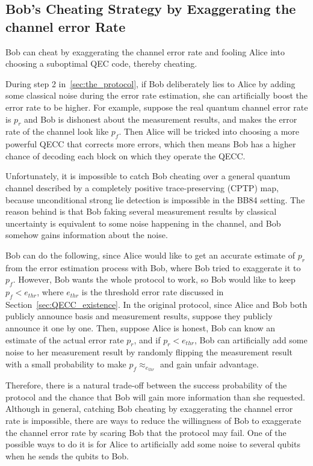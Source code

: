 \documentclass[%
 reprint,
superscriptaddress,
 amsmath,amssymb,
 aps,
]{revtex4-2}
\begin{document}
\subsection{Bob's Cheating Strategy by Exaggerating the channel error Rate}
\label{sec:Bob_cheating_error_rate}

Bob can cheat by exaggerating the channel error rate and fooling Alice into choosing a suboptimal QEC code, thereby cheating.

During step 2 in~\ref{sec:the_protocol}, if Bob deliberately lies to Alice by adding some classical noise during the error rate estimation, she can artificially boost the error rate to be higher. For example, suppose the real quantum channel error rate is $p_r$ and Bob is dishonest about the measurement results, and makes the error rate of the channel look like $p_f$. Then Alice will be tricked into choosing a more powerful QECC that corrects more errors, which then means Bob has a higher chance of decoding each block on which they operate the QECC.

Unfortunately, it is impossible to catch Bob cheating over a general quantum channel described by a completely positive trace-preserving (CPTP) map, because unconditional strong lie detection is impossible in the BB84 setting. The reason behind is that Bob faking several measurement results by classical uncertainty is equivalent to some noise happening in the channel, and Bob somehow gains information about the noise.

Bob can do the following, since Alice would like to get an accurate estimate of $p_r$ from the error estimation process with Bob, where Bob tried to exaggerate it to $p_f$. However, Bob wants the whole protocol to work, so Bob would like to keep $p_f<e_{thr}$, where $e_{thr}$ is the threshold error rate discussed in Section~\ref{sec:QECC_existence}. In the original protocol, since Alice and Bob both publicly announce basis and measurement results, suppose they publicly announce it one by one. Then, suppose Alice is honest, Bob can know an estimate of the actual error rate $p_r$, and if $p_r<e_{thr}$, Bob can artificially add some noise to her measurement result by randomly flipping the measurement result with a small probability to make $p_f\approx_{e_{thr}}$ and gain unfair advantage.

Therefore, there is a natural trade-off between the success probability of the protocol and the chance that Bob will gain more information than she requested. Although in general, catching Bob cheating by exaggerating the channel error rate is impossible, there are ways to reduce the willingness of Bob to exaggerate the channel error rate by scaring Bob that the protocol may fail. One of the possible ways to do it is for Alice to artificially add some noise to several qubits when he sends the qubits to Bob.
\end{document}
